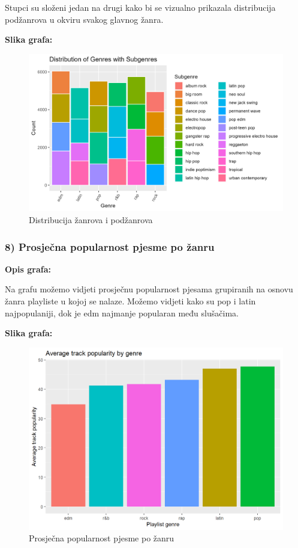 		Stupci su složeni jedan na drugi kako bi se vizualno prikazala distribucija podžanrova u okviru svakog glavnog žanra. 
	
	
	\textbf{Slika grafa:}
	\begin{figure}[H]
		\includegraphics[scale=0.9]{slike/Genre-Subgenre.png}
		\centering
		\caption{Distribucija žanrova i podžanrova}
		
	\end{figure}
	
	\subsubsection{8)  Prosječna popularnost pjesme po žanru}
	
	\textbf{Opis grafa:}
	
	Na grafu možemo vidjeti prosječnu popularnost pjesama grupiranih na osnovu žanra playliste u kojoj se nalaze. Možemo vidjeti kako su pop i latin najpopulaniji, dok je edm najmanje popularan među slušačima. 
	
	
	\textbf{Slika grafa:}
	\begin{figure}[H]
		\includegraphics[scale=0.9]{slike/genre.png}
		\centering
		\caption{ Prosječna popularnost pjesme po žanru}
		
	\end{figure}
	
